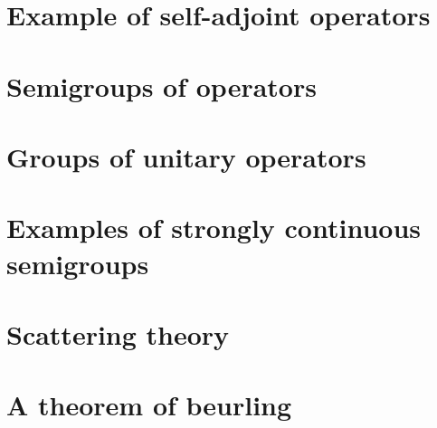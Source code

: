 \documentclass[11pt]{elegantbook}
\begin{document}
\chapter{Example of self-adjoint operators}

\chapter{Semigroups of operators}

\chapter{Groups of unitary operators}

\chapter{Examples of strongly continuous semigroups}

\chapter{Scattering theory}

\chapter{A theorem of beurling}
\end{document}
